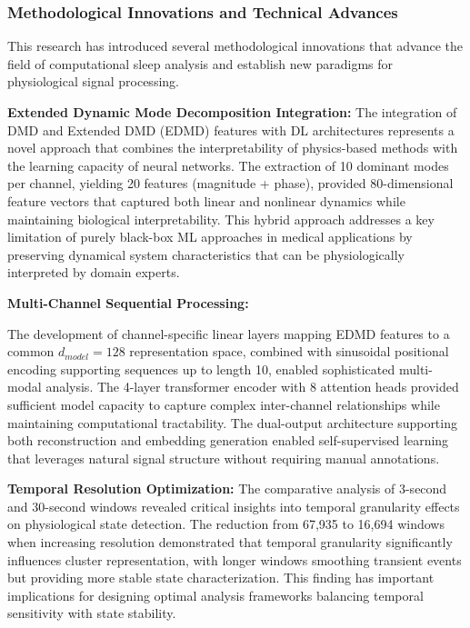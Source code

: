 \documentclass[a4paper,12pt,twoside]{article}
\begin{document}
\subsubsection{Methodological Innovations and Technical Advances}

This research has introduced several methodological innovations that advance the field of computational sleep analysis and establish new paradigms for physiological signal processing.

\textbf{Extended Dynamic Mode Decomposition Integration:}
The integration of DMD and Extended DMD (EDMD) features with DL architectures represents a novel approach that combines the interpretability of physics-based methods with the learning capacity of neural networks. The extraction of 10 dominant modes per channel, yielding 20 features (magnitude + phase), provided 80-dimensional feature vectors that captured both linear and nonlinear dynamics while maintaining biological interpretability. This hybrid approach addresses a key limitation of purely black-box ML approaches in medical applications by preserving dynamical system characteristics that can be physiologically interpreted by domain experts.

\textbf{Multi-Channel Sequential Processing:}

The development of channel-specific linear layers mapping EDMD features to a common $d_{model}=128$ representation space, combined with sinusoidal positional encoding supporting sequences up to length 10, enabled sophisticated multi-modal analysis. The 4-layer transformer encoder with 8 attention heads provided sufficient model capacity to capture complex inter-channel relationships while maintaining computational tractability. The dual-output architecture supporting both reconstruction and embedding generation
enabled self-supervised learning that leverages natural signal structure without requiring manual annotations.

\textbf{Temporal Resolution Optimization:}
The comparative analysis of 3-second and 30-second windows revealed critical insights into temporal granularity effects on physiological state detection. The reduction from 67,935 to 16,694 windows when increasing resolution demonstrated that temporal granularity significantly influences cluster representation, with longer windows smoothing transient events but providing more stable state characterization. This finding has important implications for designing optimal analysis frameworks balancing temporal sensitivity with state stability.
\end{document}
